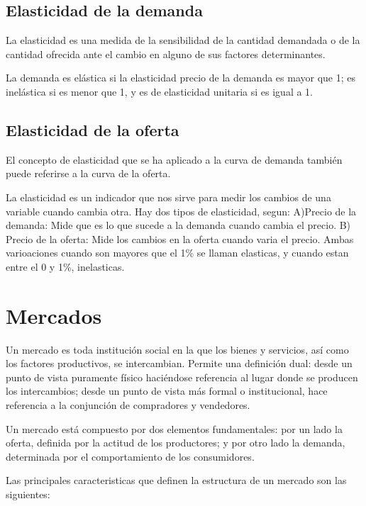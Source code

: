 \documentclass[
]{krantz}
\begin{document}
\hypertarget{elasticidad-de-la-demanda}{%
\section{Elasticidad de la demanda}\label{elasticidad-de-la-demanda}}

La elasticidad es una medida de la sensibilidad de la cantidad demandada o de la cantidad ofrecida ante el cambio en alguno de sus factores determinantes.

La demanda es elástica si la elasticidad precio de la demanda es mayor que 1; es inelástica si es menor que 1, y es de elasticidad unitaria si es igual a 1.

\hypertarget{elasticidad-de-la-oferta}{%
\section{Elasticidad de la oferta}\label{elasticidad-de-la-oferta}}

El concepto de elasticidad que se ha aplicado a la curva de demanda también puede referirse a la curva de la oferta.

La elasticidad es un indicador que nos sirve para medir los cambios de una variable cuando cambia otra. Hay dos tipos de elasticidad, segun: A)Precio de la demanda: Mide que es lo que sucede a la demanda cuando cambia el precio. B) Precio de la oferta: Mide los cambios en la oferta cuando varia el precio. Ambas varioaciones cuando son mayores que el 1\% se llaman elasticas, y cuando estan entre el 0 y 1\%, inelasticas.

\hypertarget{mercados}{%
\chapter{Mercados}\label{mercados}}

Un mercado es toda institución social en la que los bienes y servicios, así como los factores productivos, se intercambian. Permite una definición dual: desde un punto de vista puramente físico haciéndose referencia al lugar donde se producen los intercambios; desde un punto de vista más formal o institucional, hace referencia a la conjunción de compradores y vendedores.

Un mercado está compuesto por dos elementos fundamentales: por un lado la oferta, definida por la actitud de los productores; y por otro lado la demanda, determinada por el comportamiento de los consumidores.

Las principales caracteristicas que definen la estructura de un mercado son las siguientes:
\end{document}
